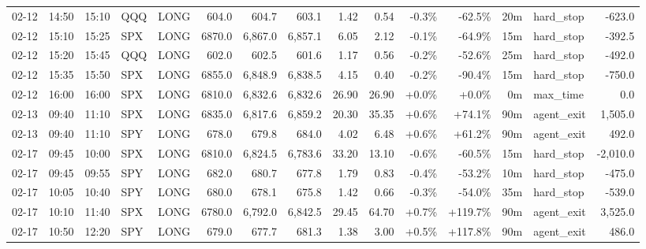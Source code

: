 \documentclass[11pt,a4paper,twoside]{article}
\begin{document}
\begin{landscape}
\begin{center}
\begin{longtable}{>{\color{txtmain}}l l l l l r r r r r r r r >{\color{txtmain}}l r}
02-12 & 14:50 & 15:10 & QQQ & LONG & 604.0 & 604.7 & 603.1 & 1.42 & 0.54 & \textcolor{lossred}{-0.3\%} & \textcolor{lossred}{-62.5\%} & 20m & hard\_stop & \textcolor{lossred}{-623.0} \\
02-12 & 15:10 & 15:25 & SPX & LONG & 6870.0 & 6,867.0 & 6,857.1 & 6.05 & 2.12 & \textcolor{lossred}{-0.1\%} & \textcolor{lossred}{-64.9\%} & 15m & hard\_stop & \textcolor{lossred}{-392.5} \\
02-12 & 15:20 & 15:45 & QQQ & LONG & 602.0 & 602.5 & 601.6 & 1.17 & 0.56 & \textcolor{lossred}{-0.2\%} & \textcolor{lossred}{-52.6\%} & 25m & hard\_stop & \textcolor{lossred}{-492.0} \\
02-12 & 15:35 & 15:50 & SPX & LONG & 6855.0 & 6,848.9 & 6,838.5 & 4.15 & 0.40 & \textcolor{lossred}{-0.2\%} & \textcolor{lossred}{-90.4\%} & 15m & hard\_stop & \textcolor{lossred}{-750.0} \\
02-12 & 16:00 & 16:00 & SPX & LONG & 6810.0 & 6,832.6 & 6,832.6 & 26.90 & 26.90 & \textcolor{wingreen}{+0.0\%} & \textcolor{wingreen}{+0.0\%} & 0m & max\_time & \textcolor{wingreen}{0.0} \\
02-13 & 09:40 & 11:10 & SPX & LONG & 6835.0 & 6,817.6 & 6,859.2 & 20.30 & 35.35 & \textcolor{wingreen}{+0.6\%} & \textcolor{wingreen}{+74.1\%} & 90m & agent\_exit & \textcolor{wingreen}{1,505.0} \\
02-13 & 09:40 & 11:10 & SPY & LONG & 678.0 & 679.8 & 684.0 & 4.02 & 6.48 & \textcolor{wingreen}{+0.6\%} & \textcolor{wingreen}{+61.2\%} & 90m & agent\_exit & \textcolor{wingreen}{492.0} \\
02-17 & 09:45 & 10:00 & SPX & LONG & 6810.0 & 6,824.5 & 6,783.6 & 33.20 & 13.10 & \textcolor{lossred}{-0.6\%} & \textcolor{lossred}{-60.5\%} & 15m & hard\_stop & \textcolor{lossred}{-2,010.0} \\
02-17 & 09:45 & 09:55 & SPY & LONG & 682.0 & 680.7 & 677.8 & 1.79 & 0.83 & \textcolor{lossred}{-0.4\%} & \textcolor{lossred}{-53.2\%} & 10m & hard\_stop & \textcolor{lossred}{-475.0} \\
02-17 & 10:05 & 10:40 & SPY & LONG & 680.0 & 678.1 & 675.8 & 1.42 & 0.66 & \textcolor{lossred}{-0.3\%} & \textcolor{lossred}{-54.0\%} & 35m & hard\_stop & \textcolor{lossred}{-539.0} \\
02-17 & 10:10 & 11:40 & SPX & LONG & 6780.0 & 6,792.0 & 6,842.5 & 29.45 & 64.70 & \textcolor{wingreen}{+0.7\%} & \textcolor{wingreen}{+119.7\%} & 90m & agent\_exit & \textcolor{wingreen}{3,525.0} \\
02-17 & 10:50 & 12:20 & SPY & LONG & 679.0 & 677.7 & 681.3 & 1.38 & 3.00 & \textcolor{wingreen}{+0.5\%} & \textcolor{wingreen}{+117.8\%} & 90m & agent\_exit & \textcolor{wingreen}{486.0} \\

\end{longtable}
\end{center}
\end{landscape}
\end{document}
